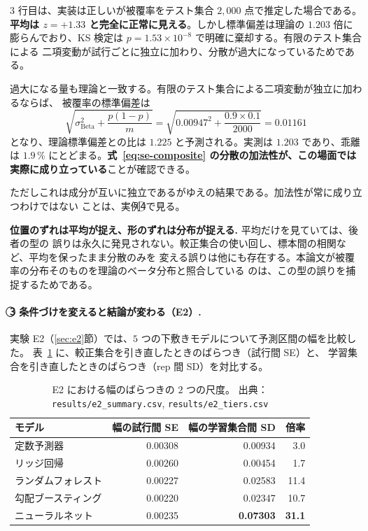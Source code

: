 \documentclass[a4paper,11pt]{jsarticle}
\theoremstyle{definition}
\theoremstyle{plain}
\theoremstyle{remark}
\newcommand{\encircle}[1]{\textcircled{\scriptsize #1}}   %
\begin{document}
$3$ 行目は、実装は正しいが被覆率をテスト集合 $2{,}000$ 点で推定した場合である。
\textbf{平均は $z=+1.33$ と完全に正常に見える}。しかし標準偏差は理論の $1.203$ 倍に
膨らんでおり、KS 検定は $p=1.53\times10^{-8}$ で明確に棄却する。有限のテスト集合による
二項変動が試行ごとに独立に加わり、分散が過大になっているためである。

過大になる量も理論と一致する。有限のテスト集合による二項変動が独立に加わるならば、
被覆率の標準偏差は
\begin{equation*}
  \sqrt{\sigma_{\mathrm{Beta}}^{2}+\frac{p(1-p)}{m}}
  =\sqrt{0.00947^{2}+\frac{0.9\times0.1}{2000}}=0.01161
\end{equation*}
となり、理論標準偏差との比は $1.225$ と予測される。実測は $1.203$ であり、乖離は
$1.9\,\%$ にとどまる。\textbf{式~\eqref{eq:se-composite} の分散の加法性が、この場面では
実際に成り立っている}ことが確認できる。

ただしこれは成分が互いに独立であるがゆえの結果である。加法性が常に成り立つわけではない
ことは、実例\encircle{4}で見る。

\textbf{位置のずれは平均が捉え、形のずれは分布が捉える.} 平均だけを見ていては、後者の型の
誤りは永久に発見されない。較正集合の使い回し、標本間の相関など、平均を保ったまま分散のみを
変える誤りは他にも存在する。本論文が被覆率の分布そのものを理論のベータ分布と照合している
のは、この型の誤りを捕捉するためである。

\paragraph{\encircle{3} 条件づけを変えると結論が変わる（E2）.}
実験 E2（\ref{sec:e2}節）では、$5$ つの下敷きモデルについて予測区間の幅を比較した。
表~\ref{tab:e2-width-se} に、較正集合を引き直したときのばらつき（試行間 SE）と、
学習集合を引き直したときのばらつき（rep 間 SD）を対比する。

\begin{table}[htbp]
  \centering
  \caption{E2 における幅のばらつきの $2$ つの尺度。
    出典：\texttt{results/e2\_summary.csv}, \texttt{results/e2\_tiers.csv}}
  \label{tab:e2-width-se}
  \begin{tabular}{lrrr}
    \toprule
    モデル & 幅の試行間 SE & 幅の学習集合間 SD & 倍率 \\
    \midrule
    定数予測器 & 0.00308 & 0.00934 & 3.0 \\
    リッジ回帰 & 0.00260 & 0.00454 & 1.7 \\
    ランダムフォレスト & 0.00227 & 0.02583 & 11.4 \\
    勾配ブースティング & 0.00220 & 0.02347 & 10.7 \\
    ニューラルネット & 0.00235 & \textbf{0.07303} & \textbf{31.1} \\
    \bottomrule
  \end{tabular}
\end{table}
\end{document}
